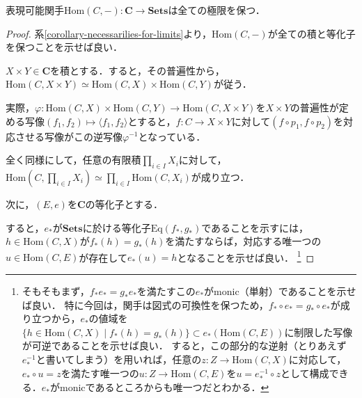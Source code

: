 \documentclass[uplatex, 12pt, dvipdfmx]{jsarticle}
\begin{document}
\vspace{3cm}

\begin{proposition}
    表現可能関手$\mathrm{Hom}(C,-):\mathbf{C}\to\mathbf{Sets}$は全ての極限を保つ．
\end{proposition}
\begin{proof}
    系\ref{corollary-necessarilies-for-limits}より，$\mathrm{Hom}(C,-)$が全ての積と等化子を保つことを示せば良い．

    $X\times Y\in\mathbf{C}$を積とする．すると，その普遍性から，$\mathrm{Hom}(C,X\times Y)\simeq \mathrm{Hom}(C,X)\times\mathrm{Hom}(C,Y)$が従う．
    \begin{center}
    \end{center}
    実際，$\varphi:\mathrm{Hom}(C,X)\times\mathrm{Hom}(C,Y)\to\mathrm{Hom}(C,X\times Y)$を$X\times Y$の普遍性が定める写像$(f_1,f_2)\mapsto\langle f_1,f_2\rangle$とすると，$f:C\to X\times Y$に対して$(f\circ p_1,f\circ p_2)$を対応させる写像がこの逆写像$\varphi^{-1}$となっている．

    全く同様にして，任意の有限積$\prod_{i\in I}X_i$に対して，$\mathrm{Hom}(C,\prod_{i\in I}X_i)\simeq\prod_{i\in I}\mathrm{Hom}(C,X_i)$が成り立つ．

    次に，$(E,e)$を$\mathbf{C}$の等化子とする．
    \begin{center}
    \end{center}
    すると，$e_*$が$\mathbf{Sets}$に於ける等化子$\mathrm{Eq}(f_*,g_*)$であることを示すには，$h\in\mathrm{Hom}(C,X)$が$f_*(h)=g_*(h)$を満たすならば，対応する唯一つの$u\in\mathrm{Hom}(C,E)$が存在して$e_*(u)=h$となることを示せば良い．
    \footnote{そもそもまず，$f_*e_*=g_*e_*$を満たすこの$e_*$がmonic（単射）であることを示せば良い．
    特に今回は，関手は図式の可換性を保つため，$f_*\circ e_*=g_*\circ e_*$が成り立つから，$e_*$の値域を$\{ h\in\mathrm{Hom}(C,X)\mid f_*(h)=g_*(h) \}\subset e_*(\mathrm{Hom}(C,E))$に制限した写像が可逆であることを示せば良い．
    すると，この部分的な逆射（とりあえず$e_*^{-1}$と書いてしまう）を用いれば，任意の$z:Z\to\mathrm{Hom}(C,X)$に対応して，$e_*\circ u=z$を満たす唯一つの$u:Z\to\mathrm{Hom}(C,E)$を$u=e_*^{-1}\circ z$として構成できる．$e_*$がmonicであるところからも唯一つだとわかる．}


\end{proof}
\end{document}

